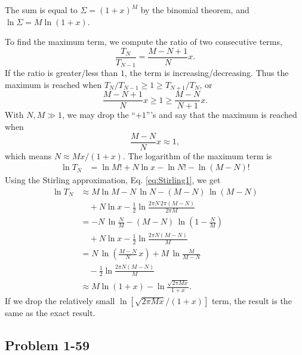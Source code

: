 \documentclass[twocolumn, 10pt]{article}
\numberwithin{equation}{section}
\newenvironment{solution}[1][\empty]
{\par\medskip\sffamily
  \textbf{\ifx\empty#1{Solution.}\relax\else{#1}\fi} \ignorespaces}
{\medskip}
\begin{document}
\begin{solution}
The sum is equal to $\Sigma = (1+x)^M$ by the binomial theorem,
and $\ln \Sigma = M \ln(1+x)$.

To find the maximum term,
we compute the ratio of two consecutive terms,
$$
  \frac{ T_N } { T_{N - 1} }
  =
  \frac{ M - N + 1 } { N } x.
$$
If the ratio is greater/less than $1$,
the term is increasing/decreasing.
Thus the maximum is reached when
  $T_N/T_{N-1} \ge 1 \ge T_{N+1}/T_N$, or
%
$$
  \frac{ M - N + 1} { N } x
  \ge 1 \ge
  \frac{ M - N } { N + 1 } x.
$$
%
With $N, M \gg 1$, we may drop the ``$+1$'''s and
say that the maximum is reached when
%
$$
  \frac{M - N}{N} x \approx 1,
$$
%
which means $N \approx M x /(1+x)$.
%
The logarithm of the maximum term is
\begin{align*}
  \ln T_N
  &= \ln M! + N \ln x - \ln N! - \ln (M-N)!
\end{align*}
%
Using the Stirling approximation, Eq. \eqref{eq:Stirling1},
we get
\begin{align*}
  \ln T_N
  &\approx M \ln M - N \, \ln N - (M - N) \, \ln(M-N) \\
  &\quad + N \ln x
  -\frac{1}{2} \ln\frac{2\pi N \, 2\pi(M-N)}{2\pi M}
  \\
  &=- N \, \ln \frac{N}{M} - (M - N) \, \ln\left(1-\frac{N}{M}\right) \\
  &\quad + N \ln x
  -\frac{1}{2} \ln\frac{2\pi N (M-N)}{M}
  \\
  &=
  N \, \ln\left( \frac{M-N}{N} \, x \right)
  + M \, \ln \frac{M}{M-N}
  \\
  &\quad -\frac{1}{2} \ln\frac{2\pi N (M-N)}{M}
  \\
  &\approx
  M\ln(1+x) - \ln\frac{ \sqrt{2\pi M x} } { 1 + x}
  .
\end{align*}
If we drop the relatively small
$\ln[\sqrt{2\pi M x}/(1 + x)]$ term,
the result is the same as the exact result.
\end{solution}



\subsection{Problem 1-59}
\end{document}
